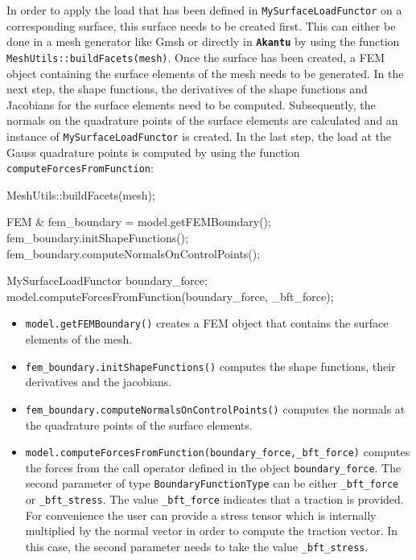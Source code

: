 \documentclass[a4paper,11pt]{book}
\newcommand{\akantu}{{\texttt{\textbf{Akantu}}}\xspace}
\newcommand{\code}[1]{\texttt{#1}}
\begin{document}
In order to apply the  load that has been defined in \code{MySurfaceLoadFunctor}
on a  corresponding surface, this  surface needs to  be created first.  This can
either be done in a mesh generator like Gmsh or directly in \akantu by using the
function \code{MeshUtils::buildFacets(mesh)}. Once the surface has been created,
a  FEM  object  containing  the  surface  elements  of  the  mesh  needs  to  be
generated. In the  next step, the shape functions, the  derivatives of the shape
functions   and    Jacobians   for   the    surface   elements   need    to   be
computed.  Subsequently, the  normals on  the quadrature  points of  the surface
elements  are  calculated  and  an instance  of  \code{MySurfaceLoadFunctor}  is
created. In the  last step, the load at the Gauss  quadrature points is computed
by using the function \code{computeForcesFromFunction}:
\begin{cpp}
  MeshUtils::buildFacets(mesh);

  FEM & fem_boundary = model.getFEMBoundary();
  fem_boundary.initShapeFunctions();
  fem_boundary.computeNormalsOnControlPoints();

  MySurfaceLoadFunctor boundary_force;
  model.computeForcesFromFunction(boundary_force, _bft_force);
\end{cpp}
\begin{itemize}
\item\code{model.getFEMBoundary()}  creates  a  FEM  object  that  contains  the
  surface elements of the mesh.
\item\code{fem\_boundary.initShapeFunctions()}  computes  the  shape  functions,
  their derivatives and the jacobians.
\item\code{fem\_boundary.computeNormalsOnControlPoints()}  computes  the normals
  at the quadrature points of the surface elements.
\item\code{model.computeForcesFromFunction(boundary\_force,\_bft\_force)}
  computes  the   forces  from   the  call  operator   defined  in   the  object
  \code{boundary\_force}.       The      second      parameter      of      type
  \code{BoundaryFunctionType}    can    be    either   \code{\_bft\_force}    or
  \code{\_bft\_stress}. The value  \code{\_bft\_force} indicates that a traction
  is provided.   For convenience the user  can provide a stress  tensor which is
  internally multiplied  by the normal vector  in order to  compute the traction
  vector.   In  this  case,  the  second  parameter  needs  to  take  the  value
  \code{\_bft\_stress}.
\end{itemize}
\end{document}
